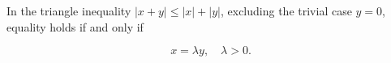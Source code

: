 In the triangle inequality $|x + y| \leq |x| + |y|$, excluding the trivial case $y = 0$, equality holds if and only if

$$x = \lambda y, \quad \lambda > 0.$$
